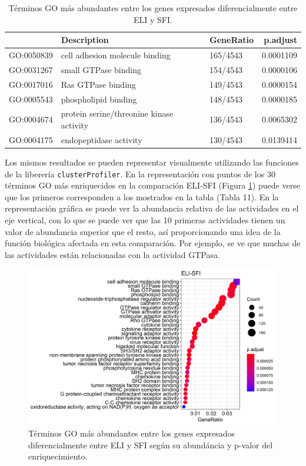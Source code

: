 \documentclass[
]{article}
\begin{document}
\begin{table}

\caption{\label{tab:unnamed-chunk-6}Términos GO más abundantes entre los genes expresados diferencialmente entre ELI y SFI.}
\centering
\begin{tabular}[t]{lllr}
\toprule
  & Description & GeneRatio & p.adjust\\
\midrule
GO:0050839 & cell adhesion molecule binding & 165/4543 & 0.0001109\\
GO:0031267 & small GTPase binding & 154/4543 & 0.0000106\\
GO:0017016 & Ras GTPase binding & 149/4543 & 0.0000154\\
GO:0005543 & phospholipid binding & 148/4543 & 0.0000185\\
GO:0004674 & protein serine/threonine kinase activity & 136/4543 & 0.0065302\\
\addlinespace
GO:0004175 & endopeptidase activity & 130/4543 & 0.0139414\\
\bottomrule
\end{tabular}
\end{table}

Los mismos resultados se pueden representar visualmente utilizando las
funciones de la liberería \texttt{clusterProfiler}. En la representación
con puntos de los 30 términos GO más enriquecidos en la comparación
ELI-SFI (Figura \ref{fig:Fig16}) puede verse que los primeros
corresponden a los mostrados en la tabla (Tabla 11). En la
representación gráfica se puede ver la abundancia relativa de las
actividades en el eje vertical, con lo que se puede ver que las 10
primeras actividades tienen un valor de abundancia superior que el
resto, así proporcionando una idea de la función biológica afectada en
esta comparación. Por ejemplo, se ve que muchas de las actividades están
relacionadas con la actividad GTPasa.

\begin{figure}

{\centering \includegraphics[width=0.8\linewidth]{results/6.GOterms/1.GOdots} 

}

\caption{Términos GO más abundantes entre los genes expresados diferencialmente entre ELI y SFI según su abundáncia y p-valor del enriquecimiento.}\label{fig:Fig16}
\end{figure}
\end{document}
